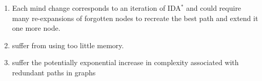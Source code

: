 \begin{enumerate}
\begin{enumerate}
        \item Each mind change corresponds to an iteration of IDA$^\ast$ and could require many re-expansions of forgotten nodes to recreate the best path and extend it one more node.
        \hfill \cite{ai/book/Artificial-Intelligence-A-Modern-Approach/Russell-Norvig}

        \item suffer from using too little memory.
        \hfill \cite{ai/book/Artificial-Intelligence-A-Modern-Approach/Russell-Norvig}

        \item suffer the potentially exponential increase in complexity associated with redundant paths in graphs
        \hfill \cite{ai/book/Artificial-Intelligence-A-Modern-Approach/Russell-Norvig}
    \end{enumerate}
\end{enumerate}


\vspace{0.5cm}

